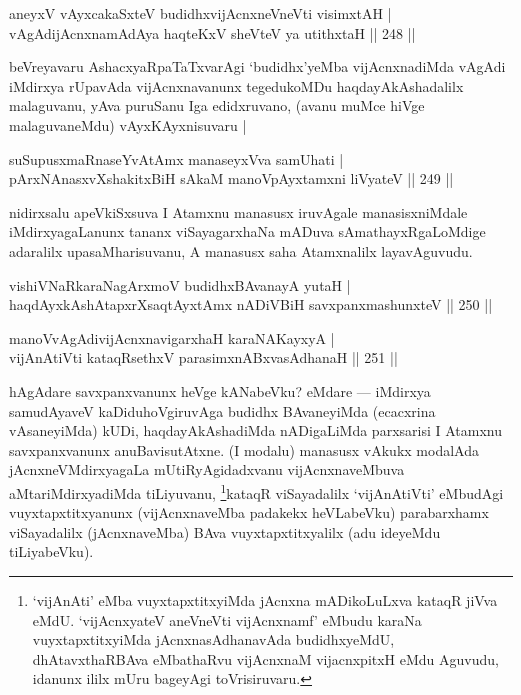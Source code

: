 
\begin{shl}
aneyxV vAyxcakaSxteV budidhxvijAcnxneVneVti visimxtAH |\\
vAgAdijAcnxnamAdAya haqteKxV sheVteV ya utithxtaH \hfill || 248 ||
\end{shl}

\begin{artha}
beVreyavaru AshacxyaRpaTaTxvarAgi `budidhx'yeMba vijAcnxnadiMda vAgAdi iMdirxya rUpavAda vijAcnxnavanunx tegedukoMDu haqdayAkAshadalilx malaguvanu, yAva puruSanu Iga edidxruvano, (avanu muMce hiVge malaguvaneMdu) vAyxKAyxnisuvaru |
\end{artha}


\begin{shl}
suSupusxmaRnaseYvA\s \s tAmx manaseyxVva samUhati |\\
pArxNAnasxvXshakitxBiH sAkaM manoV\s pAyxtamxni liVyateV \hfill || 249 ||
\end{shl}

\begin{artha}
nidirxsalu apeVkiSxsuva I Atamxnu manasusx iruvAgale manasisxniMdale  iMdirxyagaLanunx tananx viSayagarxhaNa mADuva sAmathayxRgaLoMdige adaralilx upasaMharisuvanu, A manasusx saha Atamxnalilx layavAguvudu.
\end{artha}

\begin{shl}
vishiVNaRkaraNagArxmoV budidhxBAvanayA yutaH |\\
haqdAyxkAshAtapxrXsaqtAyxtAmx nADiVBiH savxpanxmashunxteV \hfill || 250 ||
\end{shl}
\begin{shl}
manoVvAgAdivijAcnxnavigarxhaH karaNAKayxyA |\\
vijAnAtiVti kataqRsethxV parasimxnABxvasAdhanaH \hfill || 251 ||
\end{shl}

\begin{artha}
hAgAdare savxpanxvanunx heVge kANabeVku? eMdare  {\rm ---}  iMdirxya samudAyaveV kaDiduhoVgiruvAga budidhx BAvaneyiMda (ecacxrina vAsaneyiMda) kUDi, haqdayA\-kAshadiMda nADigaLiMda parxsarisi I Atamxnu savxpanxvanunx anuBavisutAtxne. (I modalu) manasusx vAkukx modalAda jAcnxneVMdirxyagaLa mUtiRyAgidadxvanu vijAcnxna\-veMbuva aMtariMdirxyadiMda tiLiyuvanu, \footnote{`vijAnAti' eMba vuyxtapxtitxyiMda jAcnxna mADikoLuLxva kataqR jiVva eMdU. `vijAcnxyateV aneVneVti vijAcnxnamf' eMbudu karaNa vuyxtapxtitxyiMda jAcnxnasAdhanavAda budidhxyeMdU, dhAtavxthaRBAva eMbathaRvu vijAcnxnaM vijacnxpitxH eMdu Aguvudu, idanunx ililx mUru bageyAgi toVrisiruvaru.}kataqR viSayadalilx `vijAnAtiVti' eMbudAgi vuyxtapxtitxyanunx (vijAcnxnaveMba padakekx heVLabeVku) parabarxhamx viSayadalilx (jAcnxnaveMba) BAva vuyxtapxtitxyalilx (adu ideyeMdu tiLiyabeVku).
\end{artha}

